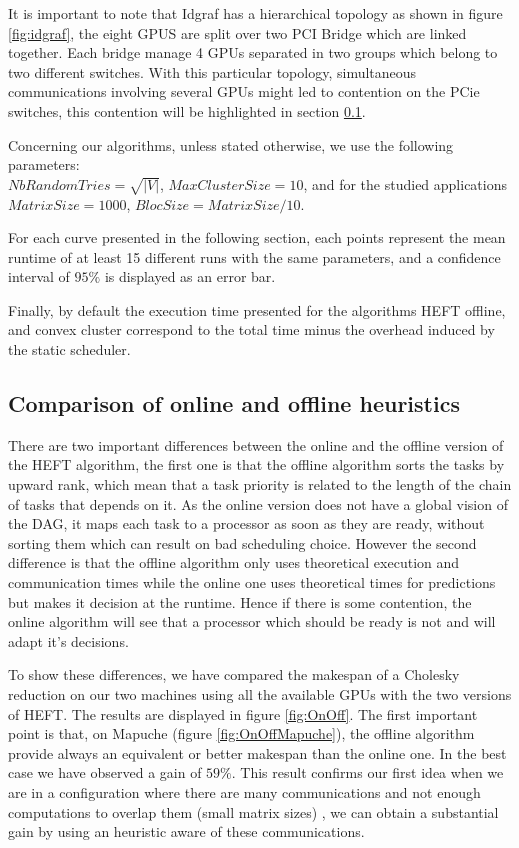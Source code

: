 \documentclass[10pt, conference, compsocconf,pdftex,dvipsnames]{IEEEtran}
\begin{document}
It is important to note that Idgraf has a hierarchical topology as shown in
figure \ref{fig:idgraf}, the eight GPUS are split over two PCI Bridge which
are linked together. Each bridge manage 4 GPUs separated in two groups which
belong to two different switches. With this particular topology, simultaneous
communications involving several GPUs might led to contention on the PCie
switches, this contention will be highlighted in section
\ref{sec:exp-exp-perf}.

Concerning our algorithms, unless stated otherwise, we use the following
parameters:\\
$NbRandomTries=\sqrt{|V|}$, $MaxClusterSize=10$, and for the
studied applications\\
$MatrixSize=1000$, $BlocSize=MatrixSize/10$.

For each curve presented in the following section, each points represent the
mean runtime of at least 15 different runs with the same parameters, and a
confidence interval of $95\%$ is displayed as an error bar.

Finally, by default the execution time presented for the algorithms HEFT
offline, and convex cluster correspond to the total time minus the overhead
induced by the static scheduler.

\subsection{Comparison of online and offline heuristics}
\label{sec:exp-exp-perf}

There are two important differences between the online and the offline version
of the HEFT algorithm, the first one is that the offline algorithm sorts the
tasks by upward rank, which mean that a task priority is related to the length
of the chain of tasks that depends on it. As the online version does not have
a global vision of the DAG, it maps each task to a processor as soon as they
are ready, without sorting them which can result on bad scheduling choice.
However the second difference is that the offline algorithm only uses
theoretical execution and communication times while the online one uses
theoretical times for predictions but makes it decision at the runtime. Hence
if there is some
contention, the online algorithm will see that a processor which should be
ready is not and will adapt it's decisions.

To show these differences, we have compared the makespan of a Cholesky
reduction on our two machines using all the available GPUs  with the two
versions of HEFT. The results are displayed in figure \ref{fig:OnOff}. The
first important point is that, on Mapuche (figure \ref{fig:OnOffMapuche}), the
offline algorithm provide always an equivalent or better makespan than the
online one. In the best case we have observed a gain of $59\%$. This result
confirms our first idea when we are in a configuration where there are many
communications and not enough computations to overlap them (small matrix
sizes) , we can obtain a substantial gain by using an heuristic aware of these
communications. 
\end{document}
